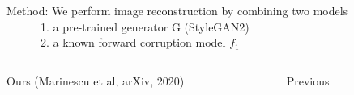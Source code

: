 \begin{frame}{Method: We perform image reconstruction by combining two models\\
\ \ \ \ \ \  1. a pre-trained generator G (StyleGAN2)\\
\ \ \ \ \ \  2. a known forward corruption model $f_1$
}



\begin{columns}[t]
 \begin{column}{0.6\textwidth}
\centering
 
\begin{overprint}
 
  \brgmoursshortloss 
  \brgmours

\end{overprint} 
  Ours (Marinescu et al, arXiv, 2020)
 \end{column}

 \begin{column}{0.3\textwidth}
  \centering

  \brgmprev
  Previous

 
 \end{column}
\end{columns} 
 


 
\end{frame}

\newcommand{\ci}[1]{\circ{#1}}
\newcommand{\wplus}{$\mathcal{W}^{+}$ }
\newcommand{\loss}{\mathcal{L}}

\newcommand{\bit}[1]{\begin{itemize} 
\item #1
\end{itemize}}

